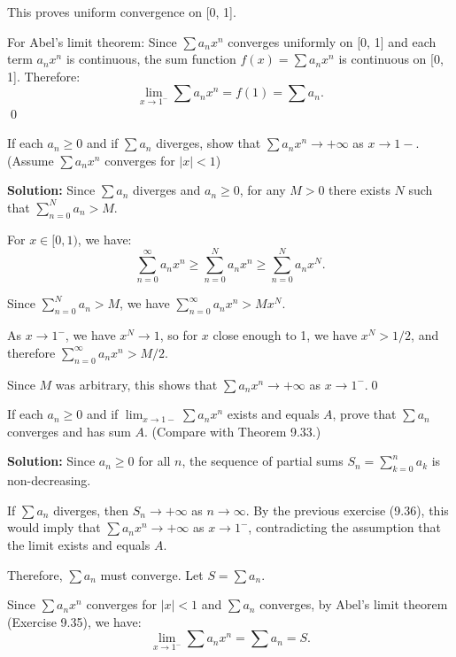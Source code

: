 This proves uniform convergence on [0, 1].

For Abel's limit theorem: Since \( \sum a_n x^n \) converges uniformly on [0, 1] and each term \( a_n x^n \) is continuous, the sum function \( f(x) = \sum a_n x^n \) is continuous on [0, 1]. Therefore:
\[\lim_{x \to 1^-} \sum a_n x^n = f(1) = \sum a_n.\]\qed


\begin{problembox}
If each \( a_n \geq 0 \) and if \( \sum a_n \) diverges, show that \( \sum a_n x^n \to + \infty \) as \( x \to 1- \). (Assume \( \sum a_n x^n \) converges for \( |x| < 1 \))
\end{problembox}

\bigskip\noindent\textbf{Solution:} Since \( \sum a_n \) diverges and \( a_n \geq 0 \), for any \( M > 0 \) there exists \( N \) such that \( \sum_{n=0}^N a_n > M \).

For \( x \in [0, 1) \), we have:
\[\sum_{n=0}^{\infty} a_n x^n \geq \sum_{n=0}^N a_n x^n \geq \sum_{n=0}^N a_n x^N.\]

Since \( \sum_{n=0}^N a_n > M \), we have \( \sum_{n=0}^{\infty} a_n x^n > M x^N \).

As \( x \to 1^- \), we have \( x^N \to 1 \), so for \( x \) close enough to 1, we have \( x^N > 1/2 \), and therefore \( \sum_{n=0}^{\infty} a_n x^n > M/2 \).

Since \( M \) was arbitrary, this shows that \( \sum a_n x^n \to +\infty \) as \( x \to 1^- \).\qed


\begin{problembox}
If each \( a_n \geq 0 \) and if \( \lim_{x \to 1-} \sum a_n x^n \) exists and equals \( A \), prove that \( \sum a_n \) converges and has sum \( A \). (Compare with Theorem 9.33.)
\end{problembox}

\bigskip\noindent\textbf{Solution:} Since \( a_n \geq 0 \) for all \( n \), the sequence of partial sums \( S_n = \sum_{k=0}^n a_k \) is non-decreasing.

If \( \sum a_n \) diverges, then \( S_n \to +\infty \) as \( n \to \infty \). By the previous exercise (9.36), this would imply that \( \sum a_n x^n \to +\infty \) as \( x \to 1^- \), contradicting the assumption that the limit exists and equals \( A \).

Therefore, \( \sum a_n \) must converge. Let \( S = \sum a_n \).

Since \( \sum a_n x^n \) converges for \( |x| < 1 \) and \( \sum a_n \) converges, by Abel's limit theorem (Exercise 9.35), we have:
\[\lim_{x \to 1^-} \sum a_n x^n = \sum a_n = S.\]

